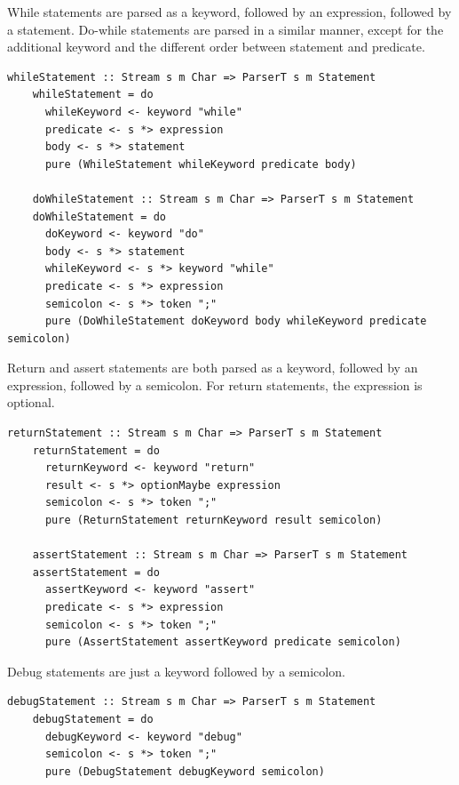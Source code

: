 \documentclass[UdineBachThesis,american,11pt]{PhdThesis}
\begin{document}
  \newpage

  While statements are parsed as a \lstinline@while@ keyword, followed by an
  expression, followed by a statement. Do-while statements are parsed in a
  similar manner, except for the additional \lstinline@do@ keyword and the
  different order between statement and predicate.

  \begin{lstlisting}[gobble=4,basicstyle=\ttfamily\small]
    whileStatement :: Stream s m Char => ParserT s m Statement
    whileStatement = do
      whileKeyword <- keyword "while"
      predicate <- s *> expression
      body <- s *> statement
      pure (WhileStatement whileKeyword predicate body)

    doWhileStatement :: Stream s m Char => ParserT s m Statement
    doWhileStatement = do
      doKeyword <- keyword "do"
      body <- s *> statement
      whileKeyword <- s *> keyword "while"
      predicate <- s *> expression
      semicolon <- s *> token ";"
      pure (DoWhileStatement doKeyword body whileKeyword predicate semicolon)
  \end{lstlisting}

  Return and assert statements are both parsed as a keyword, followed by an
  expression, followed by a semicolon. For return statements, the expression is
  optional.

  \begin{lstlisting}[gobble=4,basicstyle=\ttfamily\small]
    returnStatement :: Stream s m Char => ParserT s m Statement
    returnStatement = do
      returnKeyword <- keyword "return"
      result <- s *> optionMaybe expression
      semicolon <- s *> token ";"
      pure (ReturnStatement returnKeyword result semicolon)

    assertStatement :: Stream s m Char => ParserT s m Statement
    assertStatement = do
      assertKeyword <- keyword "assert"
      predicate <- s *> expression
      semicolon <- s *> token ";"
      pure (AssertStatement assertKeyword predicate semicolon)
  \end{lstlisting}

  Debug statements are just a \lstinline@debug@ keyword followed by a semicolon.

  \begin{lstlisting}[gobble=4,basicstyle=\ttfamily\small]
    debugStatement :: Stream s m Char => ParserT s m Statement
    debugStatement = do
      debugKeyword <- keyword "debug"
      semicolon <- s *> token ";"
      pure (DebugStatement debugKeyword semicolon)
  \end{lstlisting}
\end{document}
